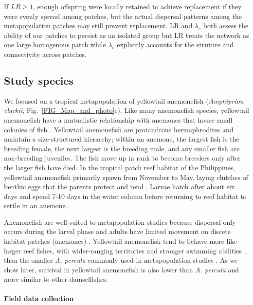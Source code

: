 \documentclass[12pt, oneside]{article}   	%
\begin{document}
If $LR \geq 1$, enough offspring were locally retained to achieve replacement if they were evenly spread among patches, but the actual dispersal patterns among the metapopulation patches may still prevent replacement. LR and $\lambda_c$ both assess the ability of our patches to persist as an isolated group but LR treats the network as one large homogenous patch while $\lambda_c$ explicitly accounts for the struture and connectivity across patches.  

\subsection*{Study species}

We focused on a tropical metapopulation of yellowtail anemonefish (\textit{Amphiprion clarkii}, Fig.\ \ref{FIG_Map_and_photo}c). Like many anemonefish species, yellowtail anemonefish have a mutualistic relationship with anemones that house small colonies of fish \citep{buston2003social, fautin1992field}. Yellowtail anemonefish are protandrous hermaphrodites and maintain a size-structured hierarchy; within an anemone, the largest fish is the breeding female, the next largest is the breeding male, and any smaller fish are non-breeding juveniles. The fish move up in rank to become breeders only after the larger fish have died. In the tropical patch reef habitat of the Philippines, yellowtail anemonefish primarily spawn from November to May, laying clutches of benthic eggs that the parents protect and tend \citep{ochi1989mating, holtswarth2017fecundity}. Larvae hatch after about six days and spend 7-10 days in the water column before returning to reef habitat to settle in an anemone \citep{fautin1992field}.

Anemonefish are well-suited to metapopulation studies because dispersal only occurs during the larval phase and adults have limited movement on discete habitat patches (anemones) \citep[e.g.][]{buston2013marine, salles_coral_2015, almany2017larval}. Yellowtail anemonefish tend to behave more like larger reef fishes, with wider-ranging territories and stronger swimming abilities \citep{hattori1991life, ochi1989mating}, than the smaller \textit{A. percula} commonly used in metapopulation studies \citep[e.g.][]{buston2011probability, salles_coral_2015}. As we show later, survival in yellowtail anemonefish is also lower than \textit{A. percula} and more similar to other damselfishes. 

\paragraph*{Field data collection}
\end{document}
